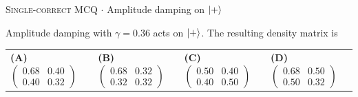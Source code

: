 \documentclass[11pt,a4paper]{article}
\newcommand{\optlabel}[1]{\textbf{(#1)}}
\newcommand{\correctlabel}[1]{\textcolor{okgreen}{\textbf{(#1)}\,\ding{51}}}
\newenvironment{qitem}[1]{\begin{list}{}{\setlength{\leftmargin}{3.3em}\setlength{\labelwidth}{3.1em}%
  \setlength{\labelsep}{0.2em}\setlength{\topsep}{3pt}\setlength{\parsep}{3pt}}\item[\textbf{Q.#1}\hfill]}{\end{list}}
\newcommand{\qmeta}[2]{{\footnotesize\color{black!60}\textsc{#1} \;$\cdot$\; #2}\par}
\begin{document}
\begin{qitem}{24}
\qmeta{Single-correct MCQ}{Amplitude damping on $\ket+$}
Amplitude damping with $\gamma = 0.36$ acts on $\ket+$. The resulting density matrix is
\par\smallskip\noindent\begin{tabularx}{\linewidth}{@{}*{4}{L}@{}}
\correctlabel{A}\,$\begin{pmatrix}0.68 & 0.40\\ 0.40 & 0.32\end{pmatrix}$ & \optlabel{B}\,$\begin{pmatrix}0.68 & 0.32\\ 0.32 & 0.32\end{pmatrix}$ & \optlabel{C}\,$\begin{pmatrix}0.50 & 0.40\\ 0.40 & 0.50\end{pmatrix}$ & \optlabel{D}\,$\begin{pmatrix}0.68 & 0.50\\ 0.50 & 0.32\end{pmatrix}$
\end{tabularx}
\end{qitem}
\end{document}
